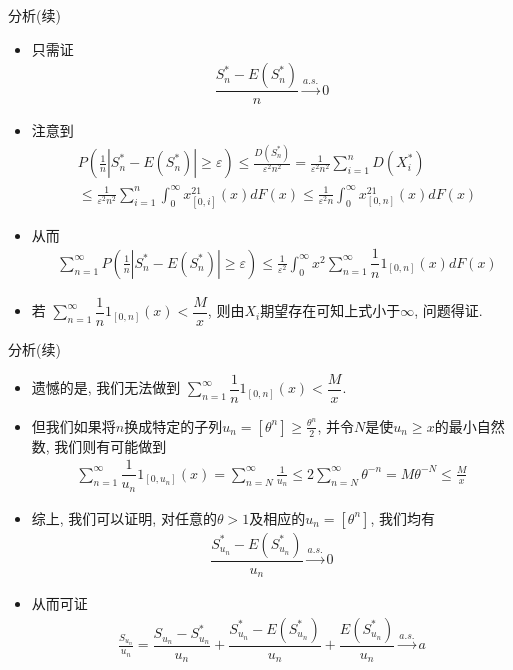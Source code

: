 \documentclass[Prob-All.tex]{subfiles}
\begin{document}
\begin{frame}{分析(续)}
	\begin{itemize}[<+-|alert@+>]
	\item 只需证
	\begin{align*}
		\dfrac{S_n^*-E(S_n^*)}{n}\stackrel{a.s.}{\rightarrow}  0
	\end{align*}
    \item 注意到
	\begin{align*}
		&P\left(\frac{1}n\left|S_n^{*}-E\left(S_n^{*}\right)\right| \geq \varepsilon\right) \leq \frac{D(S_n^*)}{\varepsilon^{2}n^2}= \frac{1}{\varepsilon^{2}n^2}\sum_{i=1}^nD(X_i^*)\\
		&\leq  \frac{1}{\varepsilon^{2}n^2}\sum_{i=1}^n \int_{0}^{\infty}x^21_{[0,i]}(x) d F(x)\leq \frac{1}{\varepsilon^{2}n} \int_{0}^{\infty}x^21_{[0,n]}(x) d F(x)
	\end{align*}
    \item 从而
	\begin{align*}
		&\sum_{n=1}^\infty P\left(\frac{1}n\left|S_n^{*}-E\left(S_n^{*}\right)\right| \geq \varepsilon\right) \leq \frac{1}{\varepsilon^{2}} \int_{0}^{\infty}x^2\sum_{n=1}^\infty \dfrac{1}{n}1_{[0,n]}(x) d F(x)
	\end{align*}
	\item 若 $\sum_{n=1}^\infty \dfrac{1}{n}1_{[0,n]}(x)<\dfrac{M}{x}$, 则由$X_i$期望存在可知上式小于$\infty$, 问题得证.
	\end{itemize}


\end{frame}

\begin{frame}{分析(续)}
	\begin{itemize}[<+-|alert@+>]
	\item  遗憾的是, 我们无法做到 $\sum_{n=1}^\infty \dfrac{1}{n}1_{[0,n]}(x)<\dfrac{M}{x}$.
	\item 但我们如果将$n$换成特定的子列$u_n=[\theta^n]\geq \frac{\theta^n}{2}$, 并令$N$是使$u_{n} \geq x$的最小自然数, 我们则有可能做到
	\begin{align*}
		\sum_{n=1}^\infty \dfrac{1}{u_n}1_{[0,u_n]}(x)=\sum_{n=N}^{\infty} \frac{1}{u_{n}}\leq 2 \sum_{n=N}^{\infty} \theta^{-n}=M \theta^{-N} \leq \frac{M}{x}
	\end{align*}

	\item 综上, 我们可以证明, 对任意的$\theta>1$及相应的$u_n=[\theta^n]$, 我们均有
	\begin{align*}
		\dfrac{S_{u_n}^*-E(S_{u_n}^*)}{u_n}\stackrel{a.s.}{\rightarrow}  0
	\end{align*}
	\item 从而可证
	\begin{align*}
		\frac{S_{u_{n}}}{u_{n}}  =\dfrac{S_{u_n}-S_{u_n}^*}{u_n}+\dfrac{S_{u_n}^*-E(S_{u_n}^*)}{u_n}+\dfrac{E(S_{u_n}^*)}{u_n}\stackrel{a.s.}{\rightarrow} a
	\end{align*}

	\end{itemize}


\end{frame}
\end{document}

